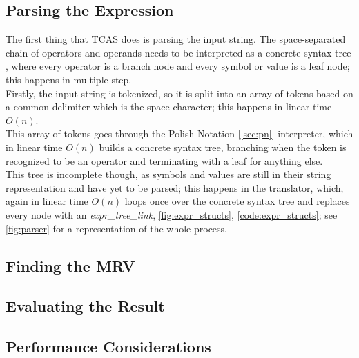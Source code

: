 \documentclass{article}
\theoremstyle{plain}
\theoremstyle{definition}
\begin{document}
	\subsection{Parsing the Expression}
	
	The first thing that TCAS does is parsing the input string. The space-separated chain of operators and operands needs to be interpreted as a concrete syntax tree \cite{wiki:parsetree}\cite{wiki:abtree}, where every operator is a branch node and every symbol or value is a leaf node; this happens in multiple step.\\
	Firstly, the input string is tokenized, so it is split into an array of tokens based on a common delimiter which is the space character; this happens in linear time \(O(n)\). \\
	This array of tokens goes through the Polish Notation [\ref{sec:pn}] interpreter, which in linear time \(O(n)\) builds a concrete syntax tree, branching when the token is recognized to be an operator and terminating with a leaf for anything else. \\
	This tree is incomplete though, as symbols and values are still in their string representation and have yet to be parsed; this happens in the translator, which, again in linear time \(O(n)\) loops once over the concrete syntax tree and replaces every node with an \textit{expr\_tree\_link}, \cref{fig:expr_structs}, \cref{code:expr_structs}; see \cref{fig:parser} for a representation of the whole process.
	
	\subsection{Finding the MRV}
	
	\subsection{Evaluating the Result}
	
	\subsection{Performance Considerations}
	
\end{document}
